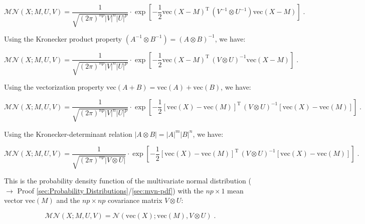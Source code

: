 \documentclass[a4paper,12pt]{book}
\begin{document}
\begin{equation} \label{eq:matn-mvn-matn-mvn-s3}
\mathcal{MN}(X; M, U, V) = \frac{1}{\sqrt{(2\pi)^{np} |V|^n |U|^p}} \cdot \exp\left[-\frac{1}{2} \mathrm{vec}(X-M)^\mathrm{T} \, \left( V^{-1} \otimes U^{-1} \right) \mathrm{vec}(X-M) \right] \; .
\end{equation}

Using the Kronecker product property $\left( A^{-1} \otimes B^{-1} \right) = \left( A \otimes B \right)^{-1}$, we have:

\begin{equation} \label{eq:matn-mvn-matn-mvn-s4}
\mathcal{MN}(X; M, U, V) = \frac{1}{\sqrt{(2\pi)^{np} |V|^n |U|^p}} \cdot \exp\left[-\frac{1}{2} \mathrm{vec}(X-M)^\mathrm{T} \, \left( V \otimes U \right)^{-1} \mathrm{vec}(X-M) \right] \; .
\end{equation}

Using the vectorization property $\mathrm{vec}(A+B) = \mathrm{vec}(A) + \mathrm{vec}(B)$, we have:

\begin{equation} \label{eq:matn-mvn-matn-mvn-s5}
\mathcal{MN}(X; M, U, V) = \frac{1}{\sqrt{(2\pi)^{np} |V|^n |U|^p}} \cdot \exp\left[-\frac{1}{2} \left[ \mathrm{vec}(X) - \mathrm{vec}(M) \right]^\mathrm{T} \, \left( V \otimes U \right)^{-1} \left[ \mathrm{vec}(X) - \mathrm{vec}(M) \right] \right] \; .
\end{equation}

Using the Kronecker-determinant relation $\lvert A \otimes B \rvert = \lvert A \rvert^m \lvert B \rvert^n$, we have:

\begin{equation} \label{eq:matn-mvn-matn-mvn-s6}
\mathcal{MN}(X; M, U, V) = \frac{1}{\sqrt{(2\pi)^{np} |V \otimes U|}} \cdot \exp\left[-\frac{1}{2} \left[ \mathrm{vec}(X) - \mathrm{vec}(M) \right]^\mathrm{T} \, \left( V \otimes U \right)^{-1} \left[ \mathrm{vec}(X) - \mathrm{vec}(M) \right] \right] \; .
\end{equation}

This is the probability density function of the multivariate normal distribution ($\rightarrow$ Proof \ref{sec:Probability Distributions}/\ref{sec:mvn-pdf}) with the $np \times 1$ mean vector $\mathrm{vec}(M)$ and the $np \times np$ covariance matrix $V \otimes U$:

\begin{equation} \label{eq:matn-mvn-matn-mvn}
\mathcal{MN}(X; M, U, V) = \mathcal{N}(\mathrm{vec}(X); \mathrm{vec}(M), V \otimes U) \; .
\end{equation}
\end{document}
